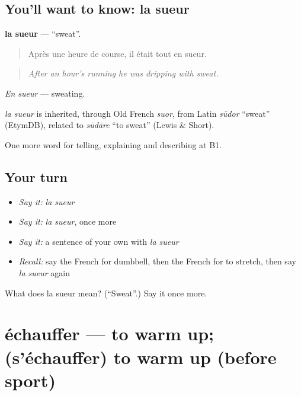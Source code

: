 \subsection*{You'll want to know: la sueur}
\textbf{la sueur} — \textquotedblleft{}sweat\textquotedblright{}.

\begin{quote}
Après une heure de course, il était tout en sueur.
\end{quote}

\begin{quote}
\emph{After an hour's running he was dripping with sweat.}
\end{quote}

\emph{En sueur} — sweating.

\begin{cousinweb}
\emph{la sueur} is inherited, through Old French \emph{suor}, from Latin \emph{sūdor} \textquotedblleft{}sweat\textquotedblright{} (EtymDB), related to \emph{sūdāre} \textquotedblleft{}to sweat\textquotedblright{} (Lewis \& Short).
\end{cousinweb}

\begin{grammarlens}[title={What you've built}]
One more word for telling, explaining and describing at B1.
\end{grammarlens}

\subsection*{Your turn}
\begin{itemize}
\raggedright
  \item \emph{Say it:} \emph{la sueur}
  \item \emph{Say it:} \emph{la sueur}, once more
  \item \emph{Say it:} a sentence of your own with \emph{la sueur}
  \item \emph{Recall:} say the French for dumbbell, then the French for to stretch, then say \emph{la sueur} again
\end{itemize}

\begin{tcolorbox}[breakable,colback=teal!4,colframe=teal!35!black,title={Before you move on}]
What does la sueur mean? (\textquotedblleft{}Sweat\textquotedblright{}.) Say it once more.
\end{tcolorbox}
\section[échauffer]{échauffer — to warm up; (s'échauffer) to warm up (before sport)}

